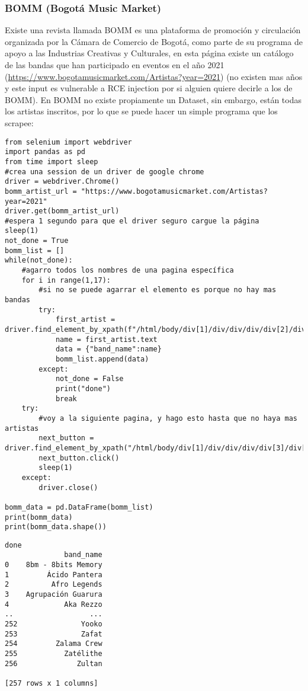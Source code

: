 \documentclass[11pt]{article}
\begin{document}
\subsubsection{BOMM (Bogotá Music Market)}
\label{sec:org519ba6d}
Existe una revista llamada BOMM es una plataforma de promoción y circulación organizada por la Cámara de Comercio de Bogotá, como parte de su programa de apoyo a las Industrias Creativas y Culturales, en esta página existe un catálogo de las bandas que han participado en eventos en el año 2021 (\url{https://www.bogotamusicmarket.com/Artistas?year=2021}) (no existen mas años y este input es vulnerable a RCE injection por si alguien quiere decirle a los de BOMM).
En BOMM no existe propiamente un Dataset, sin embargo, están todas los artistas inscritos, por lo que se puede hacer un simple programa que los scrapee:
\begin{verbatim}
from selenium import webdriver
import pandas as pd
from time import sleep
#crea una session de un driver de google chrome
driver = webdriver.Chrome()
bomm_artist_url = "https://www.bogotamusicmarket.com/Artistas?year=2021"
driver.get(bomm_artist_url)
#espera 1 segundo para que el driver seguro cargue la página
sleep(1)
not_done = True
bomm_list = []
while(not_done):
    #agarro todos los nombres de una pagina específica
    for i in range(1,17):
        #si no se puede agarrar el elemento es porque no hay mas bandas
        try:
            first_artist = driver.find_element_by_xpath(f"/html/body/div[1]/div/div/div/div[2]/div/div[{i}]/figure/figcaption/h4/a")
            name = first_artist.text
            data = {"band_name":name}
            bomm_list.append(data)
        except:
            not_done = False
            print("done")
            break
    try:
        #voy a la siguiente pagina, y hago esto hasta que no haya mas artistas
        next_button = driver.find_element_by_xpath("/html/body/div[1]/div/div/div/div[3]/div[3]/div/a")
        next_button.click()
        sleep(1)
    except:
        driver.close()

bomm_data = pd.DataFrame(bomm_list)
print(bomm_data)
print(bomm_data.shape())
\end{verbatim}

\begin{verbatim}
done
              band_name
0    8bm - 8bits Memory
1         Ácido Pantera
2          Afro Legends
3    Agrupación Guarura
4             Aka Rezzo
..                  ...
252               Yooko
253               Zafat
254         Zalama Crew
255           Zatélithe
256              Zultan

[257 rows x 1 columns]
\end{verbatim}
\end{document}
